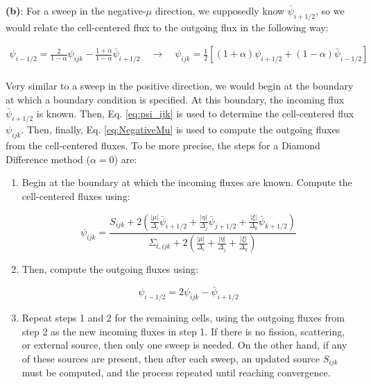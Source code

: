 \documentclass[10pt]{article}
\begin{document}
\textbf{(b)}: For a sweep in the negative-\(\mu\) direction, we supposedly know \(\bar{\psi}_{i+1/2}\), so we would relate the cell-centered flux to the outgoing flux in the following way:

\begin{equation}
\label{eq:NegativeMu}
\begin{aligned}
\psi_{i-1/2}=\frac{2}{1-\alpha}\psi_{ijk}-\frac{1+\alpha}{1-\alpha}\bar{\psi}_{i+1/2}\quad\rightarrow\quad\psi_{ijk}=\frac{1}{2}\left\lbrack(1+\alpha)\psi_{i+1/2}+(1-\alpha)\bar{\psi}_{i-1/2}\right\rbrack\\
\end{aligned}
\end{equation}

Very similar to a sweep in the positive direction, we would begin at the boundary at which a boundary condition is specified. At this boundary, the incoming flux \(\bar{\psi}_{i+1/2}\) is known. Then, Eq. \eqref{eq:psi_ijk} is used to determine the cell-centered flux \(\psi_{ijk}\). Then, finally, Eq. \eqref{eq:NegativeMu} is used to compute the outgoing fluxes from the cell-centered fluxes. To be more precise, the steps for a Diamond Difference method (\(\alpha=0\)) are:

\begin{enumerate}
\item Begin at the boundary at which the incoming fluxes are known. Compute the cell-centered fluxes using:

\begin{equation}
\psi_{ijk}=\frac{S_{ijk}+2\left(\frac{|\mu|}{\Delta_i}\bar{\psi}_{i+1/2}+\frac{|\eta|}{\Delta_j}\bar{\psi}_{j+1/2}+\frac{|\xi|}{\Delta_k}\bar{\psi}_{k+1/2}\right)}{\Sigma_{t,ijk}+2\left(\frac{|\mu|}{\Delta_i}+\frac{|\eta|}{\Delta_j}+\frac{|\xi|}{\Delta_k}\right)}
\end{equation}

\item Then, compute the outgoing fluxes using:

\begin{equation}
\psi_{i-1/2}=2\psi_{ijk}-\bar{\psi}_{i+1/2}
\end{equation}

\item Repeat steps 1 and 2 for the remaining cells, using the outgoing fluxes from step 2 as the new incoming fluxes in step 1. If there is no fission, scattering, or external source, then only one sweep is needed. On the other hand, if any of these sources are present, then after each sweep, an updated source \(S_{ijk}\) must be computed, and the process repeated until reaching convergence.
\end{enumerate}
\end{document}
